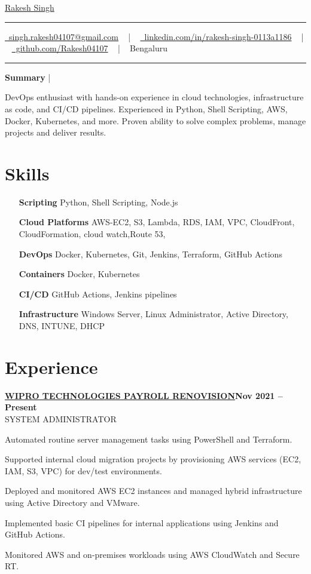 \documentclass[letterpaper,10pt]{article}
\newcommand{\documentTitle}[2]{
  \begin{center}
    {\Huge\color{accentTitle} #1}
    \vspace{10pt}
    {\color{accentLine} \hrule}
    \vspace{2pt}
    \footnotesize{#2}
    \vspace{2pt}
    {\color{accentLine} \hrule}
  \end{center}
}
\newcommand{\tinysection}[1]{
  \phantomsection
  \addcontentsline{toc}{section}{#1}
  {\large{\bfseries\color{accentText}#1} {\color{accentLine} |}}
}
\newcommand{\heading}[2]{
  \hspace{10pt}#1\hfill#2\\
}
\newcommand{\headingBf}[2]{
  \heading{\textbf{#1}}{\textbf{#2}}
}
\newcommand{\headingIt}[2]{
  \heading{\textit{#1}}{\textit{#2}}
}
\newenvironment{resume_list}{
  \vspace{-7pt}
  \begin{itemize}[itemsep=-2px, parsep=1pt, leftmargin=30pt]
}{
  \end{itemize}
}
\begin{document}
\documentTitle{\href{https://rakeshinfo.xyz}{Rakesh Singh}}{
  \href{mailto:singh.rakesh04107@gmail.com}{\raisebox{-0.15\height} 
  \faEnvelope\ singh.rakesh04107@gmail.com} ~ | ~
  \href{https://www.linkedin.com/in/rakesh-singh-0113a1186}{\raisebox{-0.15\height} \faLinkedin\ linkedin.com/in/rakesh-singh-0113a1186} ~ | ~
  \href{https://github.com/Rakesh04107}{\raisebox{-0.15\height} \faGithub\ github.com/Rakesh04107} ~ | ~
  Bengaluru
}
\tinysection{Summary}
DevOps enthusiast with hands-on experience in cloud technologies, infrastructure as code, and CI/CD pipelines. Experienced in Python, Shell Scripting, AWS, Docker, Kubernetes, and more. Proven ability to solve complex problems, manage projects and deliver results.

\section{Skills}
\begin{multicols}{2}
  \begin{itemize}[itemsep=-2px, parsep=1pt, leftmargin=75pt]
    \item[\textbf{ Scripting}] Python, Shell Scripting, Node.js
    \item[\textbf{Cloud Platforms}] AWS-EC2, S3, Lambda, RDS, IAM, VPC, CloudFront, CloudFormation, cloud watch,Route 53,
    \item[\textbf{DevOps}] Docker, Kubernetes, Git, Jenkins, Terraform, GitHub Actions
    \item[\textbf{Containers}] Docker, Kubernetes
    \item[\textbf{CI/CD}] GitHub Actions, Jenkins pipelines
    \item[\textbf{Infrastructure}] Windows Server, Linux Administrator, Active Directory, DNS, INTUNE, DHCP
  \end{itemize}
\end{multicols}

\section{Experience}

\headingBf{\href {https://www.impressico.com}{ WIPRO TECHNOLOGIES PAYROLL {RENOVISION}}{Nov 2021 -- Present} } 
\headingIt{SYSTEM ADMINISTRATOR}{}  
\begin{resume_list}  
  \item Automated routine server management tasks using PowerShell and Terraform.  
  \item  Supported internal cloud migration projects by provisioning AWS services (EC2, IAM, S3, VPC) for dev/test
 environments.
  \item Deployed and monitored AWS EC2 instances and managed hybrid infrastructure using Active Directory and
 VMware.
  \item Implemented basic CI pipelines for internal applications using Jenkins and GitHub Actions.
  \item Monitored AWS and on-premises workloads using AWS CloudWatch and Secure RT.
\end{resume_list}
\end{document}
